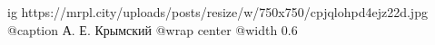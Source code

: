  
 
 
 
 

\ifcmt
  ig https://mrpl.city/uploads/posts/resize/w/750x750/cpjqlohpd4ejz22d.jpg
	@caption А. Е. Крымский
  @wrap center
  @width 0.6
\fi
